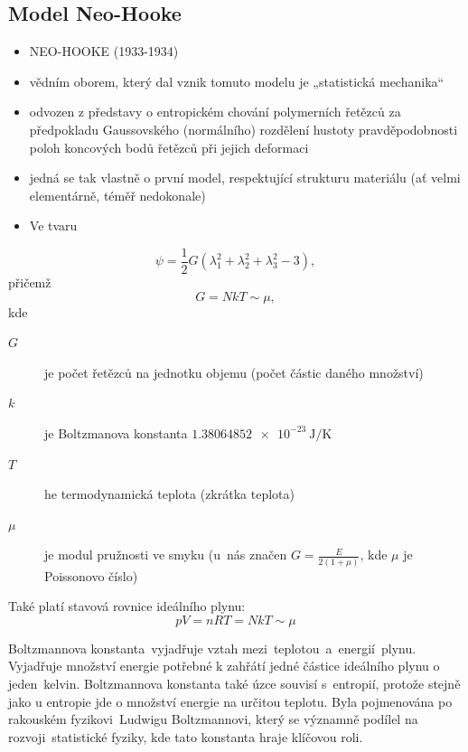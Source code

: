 
\subsection{Model Neo-Hooke}\label{sec:neo-hooke}
\begin{itemize}
	\item NEO-HOOKE (1933-1934) 
	\item vědním oborem, který dal vznik tomuto modelu je „statistická mechanika“
	\item odvozen z představy o entropickém chování polymerních řetězců za předpokladu Gaussovského (normálního) rozdělení hustoty pravděpodobnosti poloh koncových bodů řetězců při jejich deformaci
	\item jedná se tak vlastně o první model, respektující strukturu materiálu (ať velmi elementárně, téměř nedokonale)
	\item Ve tvaru
\end{itemize}
\begin{equation}
	\psi = \frac{1}{2} G \left( \lambda_1^2 + \lambda_2^2 + \lambda_3^2 - 3 \right),
\end{equation}
přičemž
\begin{equation}
	G = N k T \sim \mu,
\end{equation}
kde
\begin{description}
	\item[$G$] je počet řetězců na jednotku objemu (počet částic daného množství)
	\item[$k$] je Boltzmanova konstanta $\SI{1.38064852e-23}{\joule\per\kelvin}$
	\item[$T$] he termodynamická teplota (zkrátka teplota)
	\item[$\mu$] je modul pružnosti ve smyku (u~nás značen $G = \frac{E}{2(1+\mu)}$, kde $\mu$ je Poissonovo číslo)
\end{description}

Také platí stavová rovnice ideálního plynu:
\begin{equation}
	p V = n R T = N k T \sim \mu
\end{equation}

Boltzmannova konstanta vyjadřuje vztah mezi teplotou a energií plynu. Vyjadřuje množství energie potřebné k zahřátí jedné částice ideálního plynu o jeden kelvin. Boltzmannova konstanta také úzce souvisí s entropií, protože stejně jako u entropie jde o množství energie na určitou teplotu. Byla pojmenována po rakouském fyzikovi Ludwigu Boltzmannovi, který se významně podílel na rozvoji statistické fyziky, kde tato konstanta hraje klíčovou roli.

